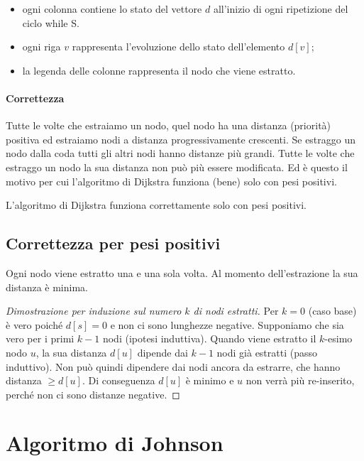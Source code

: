 \begin{itemize}
	\item ogni colonna contiene lo stato del vettore $d$ all'inizio di ogni ripetizione del ciclo \textsf{while} \Not S.\setEmpty
	\item ogni riga \(v\) rappresenta l'evoluzione dello stato dell'elemento \(d[v]\);
	\item la legenda delle colonne rappresenta il nodo che viene estratto.
\end{itemize}

\paragraph{Correttezza}
Tutte le volte che estraiamo un nodo, quel nodo ha una distanza (priorità) positiva ed estraiamo nodi a distanza progressivamente crescenti.
Se estraggo un nodo dalla coda tutti gli altri nodi hanno distanze più grandi.
Tutte le volte che estraggo un nodo la sua distanza non può più essere modificata.
Ed è questo il motivo per cui l'algoritmo di Dijkstra funziona (bene) solo con pesi positivi.

\begin{note}
L'algoritmo di Dijkstra funziona correttamente solo con pesi positivi.
\end{note}

\subsection{Correttezza per pesi positivi}

Ogni nodo viene estratto una e una sola volta.
Al momento dell'estrazione la sua distanza è minima.

\begin{proof}[Dimostrazione per induzione sul numero \(k\) di nodi estratti]
Per \(k=0\) (caso base) è vero poiché \mbox{\(d[s]=0\)} e non ci sono lunghezze negative.
Supponiamo che sia vero per i primi \(k-1\) nodi (ipotesi induttiva).
Quando viene estratto il \(k\)-esimo nodo \(u\), la sua distanza \(d[u]\) dipende dai \(k-1\) nodi già estratti (passo induttivo).
Non può quindi dipendere dai nodi ancora da estrarre, che hanno distanza \(\geqslant d[u]\).
Di conseguenza \(d[u]\) è minimo e \(u\) non verrà più re-inserito, perché non ci sono distanze negative.
\end{proof}

\section{Algoritmo di Johnson}

